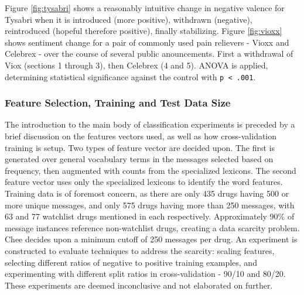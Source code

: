 \documentclass[twoside,11pt]{article}
\begin{document}
Figure \ref{fig:tysabri} shows a reasonably intuitive change in negative valence for Tysabri when it is introduced (more positive), withdrawn (negative), reintroduced (hopeful therefore positive), finally stabilizing. Figure \ref{fig:vioxx} shows sentiment change for a pair of commonly used pain relievers - Vioxx and Celebrex - over the course of several public anouncements. First a withdrawal of Viox (sections 1 through 3), then Celebrex (4 and 5). ANOVA is applied, determining statistical significance against the control with \verb|p < .001|.

\subsubsection{Feature Selection, Training and Test Data Size}
The introduction to the main body of classification experiments is preceded by a brief discussion on the features vectors used, as well as how cross-validation training is setup. Two types of feature vector are decided upon. The first is generated over general vocabulary terms in the messages selected based on frequency, then augmented with counts from the specialized lexicons. The second feature vector uses only the specialized lexicons to identify the word features.
Training data is of foremost concern, as there are only 435 drugs having 500 or more unique messages, and only 575 drugs having more than 250 messages, with 63 and 77 watchlist drugs mentioned in each respectively. Approximately 90\% of message instances reference non-watchlist drugs, creating a data scarcity problem. Chee decides upon a minimum cutoff of 250 messages per drug. An experiment is constructed to evaluate techniques to address the scarcity: scaling features, selecting different ratios of negative to positive training examples, and experimenting with different split ratios in cross-validation - 90/10 and 80/20. These experiments are deemed inconclusive and not elaborated on further.
\end{document}
